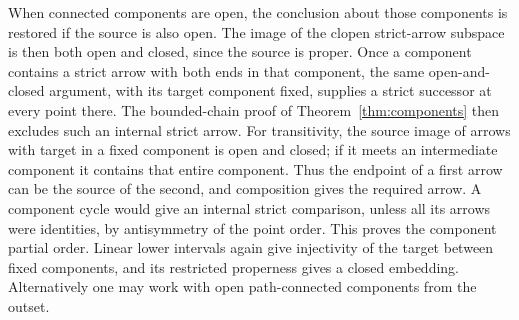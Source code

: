 \documentclass[11pt,a4paper]{article}
\theoremstyle{definition}
\begin{document}
When connected components are open, the conclusion about those components
is restored if the source is also open. The image of the clopen strict-arrow subspace is then
both open and closed, since the source is proper. Once a component
contains a strict arrow with both ends in that component, the same
open-and-closed argument, with its target component fixed, supplies a
strict successor at every point there. The bounded-chain proof of
Theorem~\ref{thm:components} then excludes such an internal strict arrow.
For transitivity, the source image of arrows with target in a fixed
component is open and closed; if it meets an intermediate component it
contains that entire component. Thus the endpoint of a first arrow can
be the source of the second, and composition gives the required arrow.
A component cycle would give an internal strict comparison, unless all
its arrows were identities, by antisymmetry of the point order. This
proves the component partial order. Linear lower intervals again give
injectivity of the target between fixed components, and its restricted
properness gives a closed embedding. Alternatively one may work with
open path-connected components from the outset.
\end{document}
